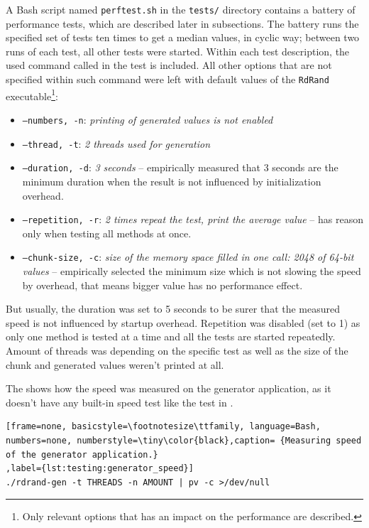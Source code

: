 \par{
A Bash script named {\tt perftest.sh} in the {\tt tests/} directory contains a battery of performance tests, which are described later in subsections. The battery runs the specified set of tests ten times to get a median values, in cyclic way; between two runs of each test, all other tests were started. Within each test description, the used command called in the test is included. All other options that are not specified within such command were left with default values of the {\tt RdRand} executable\footnote{Only relevant options that has an impact on the performance are described.}:
}

\begin{itemize}
 \item {\tt --numbers, -n}: {\em printing of generated values is not enabled}
 \item {\tt --thread, -t}: {\em 2 threads used for generation}
 \item {\tt --duration, -d}: {\em 3 seconds} -- empirically measured that 3 seconds are the minimum duration when the result is not influenced by initialization overhead.
 \item {\tt --repetition, -r}: {\em 2 times repeat the test, print the average value} -- has reason only when testing all methods at once.
 \item {\tt --chunk-size, -c}: {\em size of the memory space filled in one call: 2048 of 64-bit values} -- empirically selected the minimum size which is not slowing the speed by overhead, that means bigger value has no performance effect.
\end{itemize}

\par{
But usually, the duration was set to 5 seconds to be surer that the measured speed is not influenced by startup overhead. Repetition was disabled (set to 1) as only one method is tested at a time and all the tests are started repeatedly. Amount of threads was depending on the specific test as well as the size of the chunk and generated values weren't printed at all.
}

\par{
The  shows how the speed was measured on the generator application, as it doesn't have any built-in speed test like the test in .
}

\begin{lstlisting}[frame=none, basicstyle=\footnotesize\ttfamily, language=Bash, numbers=none, numberstyle=\tiny\color{black},caption= {Measuring speed of the generator application.}
,label={lst:testing:generator_speed}]
./rdrand-gen -t THREADS -n AMOUNT | pv -c >/dev/null
\end{lstlisting}

